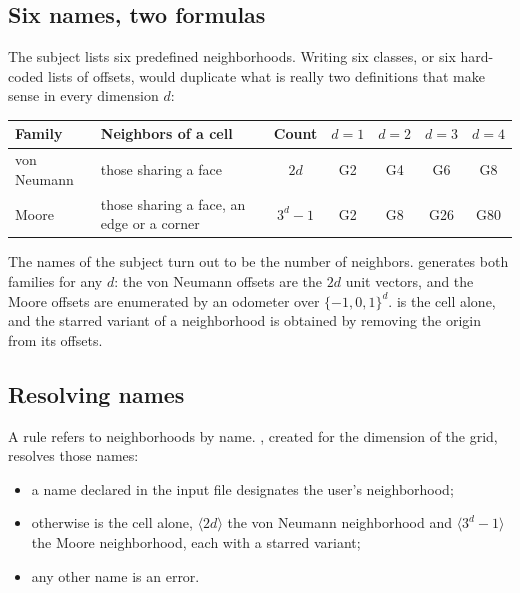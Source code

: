 \subsection{Six names, two formulas}

The subject lists six predefined neighborhoods. Writing six classes, or six hard-coded lists of
offsets, would duplicate what is really two definitions that make sense in every dimension $d$:

\begin{center}\small
    \begin{tabular}{@{}llccccc@{}}
        \toprule
        Family      & Neighbors of a cell                       & Count     & $d = 1$ & $d = 2$ & $d = 3$ & $d = 4$ \\
        \midrule
        von Neumann & those sharing a face                      & $2d$      & G2      & G4      & G6      & G8      \\
        Moore       & those sharing a face, an edge or a corner & $3^d - 1$ & G2      & G8      & G26     & G80     \\
        \bottomrule
    \end{tabular}
\end{center}

The names of the subject turn out to be the number of neighbors.  generates
both families for any $d$: the von Neumann offsets are the $2d$ unit vectors, and the Moore
offsets are enumerated by an odometer over $\{-1, 0, 1\}^d$.  is the cell alone, and
the starred variant of a neighborhood is obtained by removing the origin from its offsets.

\subsection{Resolving names}

A rule refers to neighborhoods by name. , created for the dimension of
the grid, resolves those names:

\begin{itemize}
    \item a name declared in the input file designates the user's neighborhood;
    \item otherwise  is the cell alone, $\langle 2d \rangle$ the von Neumann
          neighborhood and $\langle 3^d - 1 \rangle$ the Moore neighborhood, each with a
          starred variant;
    \item any other name is an error.
\end{itemize}

